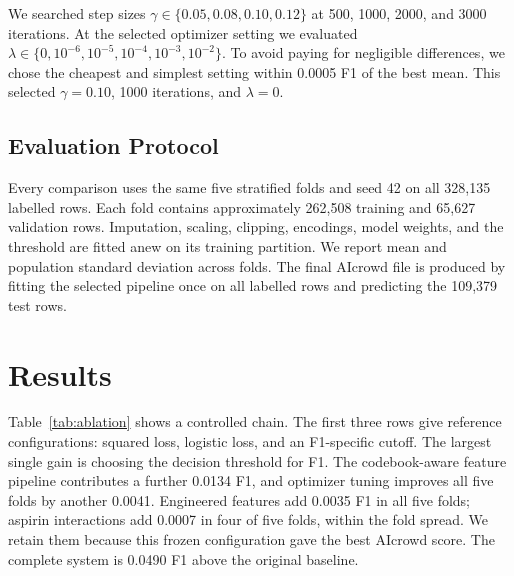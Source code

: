 \documentclass[10pt,conference,compsocconf]{IEEEtran}
\begin{document}
We searched step sizes $\gamma\in\{0.05,0.08,0.10,0.12\}$ at 500, 1000,
2000, and 3000 iterations.  At the selected optimizer setting we evaluated
$\lambda\in\{0,10^{-6},10^{-5},10^{-4},10^{-3},10^{-2}\}$.  To avoid paying
for negligible differences, we chose the cheapest and simplest setting
within 0.0005 F1 of the best mean.  This selected $\gamma=0.10$, 1000
iterations, and $\lambda=0$.

\subsection{Evaluation Protocol}

Every comparison uses the same five stratified folds and seed 42 on all
328,135 labelled rows.  Each fold contains approximately 262,508 training and
65,627 validation rows.  Imputation, scaling, clipping, encodings, model
weights, and the threshold are fitted anew on its training partition.  We
report mean and population standard deviation across folds.  The final
AIcrowd file is produced by fitting the selected pipeline once on all labelled
rows and predicting the 109,379 test rows.

\section{Results}

Table~\ref{tab:ablation} shows a controlled chain.  The first three rows give
reference configurations: squared loss, logistic loss, and an F1-specific
cutoff.  The largest single gain is choosing the decision threshold for F1.
The codebook-aware feature pipeline contributes a further 0.0134 F1, and
optimizer tuning improves all five folds by another 0.0041.  Engineered
features add 0.0035 F1 in all five folds; aspirin interactions add 0.0007 in
four of five folds, within the fold spread.  We retain them because this frozen
configuration gave the best AIcrowd score.  The complete system is 0.0490 F1
above the original baseline.
\end{document}
